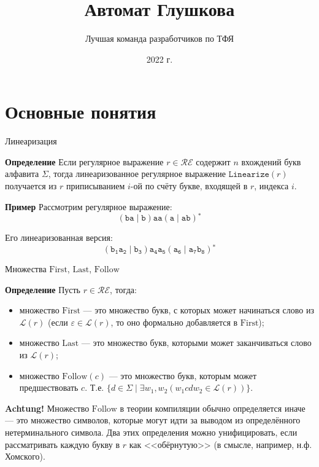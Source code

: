 \documentclass[mathserif]{beamer}
\title[] {Автомат Глушкова}
\author[Chipollino]{Лучшая команда разработчиков по ТФЯ} %
\date[] 
{2022 г.}
\newcommand{\Lang}{\mathscr{L}} %
\def\Linearize{\mathtt{Linearize}} %
\def\First{\mathrm{First}} %
\def\Last{\mathrm{Last}}
\def\Follow{\mathrm{Follow}}
\def\alter{\ensuremath{\mathrel{\vert}}}%
\def\star{\ensuremath{^{*}}}%
\def\regexpstr#1{\mathtt{#1}}%
\newcommand{\empt}{\varepsilon} %
\newcommand{\RegExp}{\mathcal{RE}} %
\begin{document}
\maketitle
\section{Основные понятия}
\begin{frame}{Линеаризация}
  \begin{block}{\bf Определение}
    Если регулярное выражение $r\in\RegExp$ содержит $n$ вхождений букв алфавита $\Sigma$, тогда линеаризованное регулярное выражение $\Linearize(r)$ получается из $r$ приписыванием $i$-ой по счёту букве, входящей в $r$, индекса $i$.
  \end{block} %

  \begin{exampleblock}{\bf Пример}
    Рассмотрим регулярное выражение:
    \[(\regexpstr{ba}\alter \regexpstr{b})\regexpstr{aa}(\regexpstr{a}\alter\regexpstr{ab})\star\] %

    Его линеаризованная версия:
    \[(\regexpstr{b_{1}a_{2}}\alter \regexpstr{b_{3}})\regexpstr{a_{4}a_{5}}(\regexpstr{a_{6}}\alter\regexpstr{a_{7}b_{8}})\star\] %

  \end{exampleblock}

\end{frame}

\begin{frame}{Множества $\First$, $\Last$, $\Follow$}
  \vspace{-5pt}%
  \begin{block}{\bf Определение}
    Пусть $r\in\RegExp$, тогда:
    \begin{itemize}
      \item множество $\First$ --- это множество букв, с которых может начинаться слово из $\Lang(r)$ (если $\empt\in\Lang(r)$, то оно формально добавляется в $\First$);
      \item множество $\Last$ --- это множество букв, которыми может заканчиваться слово из $\Lang(r)$;
      \item множество $\Follow(c)$ --- это множество букв, которым может предшествовать $c$. Т.е. $\bigl\lbrace d\in\Sigma\mid \exists w_1,w_2(w_1 c d w_2\in\Lang(r))\bigr\rbrace$.
    \end{itemize}
  \end{block} %

  \begin{alertblock}{\bf Achtung!}
    \small
    Множество $\Follow$ в теории компиляции обычно определяется иначе --- это множество символов, которые могут идти за выводом из определённого нетерминального символа. Два этих определения можно унифицировать, если рассматривать каждую букву в $r$ как <<обёрнутую>> (в смысле, например, н.ф. Хомского).
  \end{alertblock} %
\end{frame}
\end{document}
